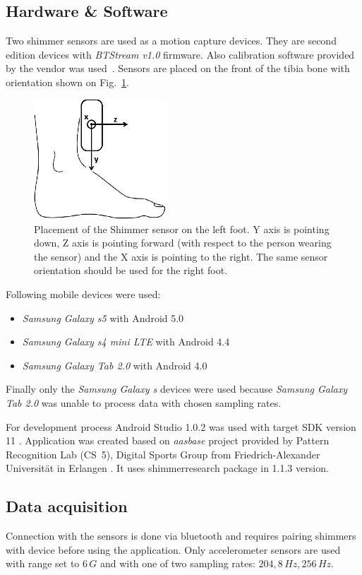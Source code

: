 \documentclass[conference]{IEEEtran}
\begin{document}
\subsection{Hardware \& Software}
Two shimmer sensors are used as a motion capture devices.
They are second edition devices with \emph{BTStream v1.0} firmware. Also calibration software provided by the vendor was used~\cite{ShimmerCalibration}.
Sensors are placed on the front of the tibia bone with orientation shown on Fig.~\ref{fig:ShimmerPlacement}.

\begin{figure}[!h]
    \centering
    \includegraphics[width=5cm]{Images/Foot.jpg}
    \caption{Placement of the Shimmer sensor on the left foot.
    Y axis is pointing down, Z axis is pointing forward (with respect to the person wearing the sensor) and the X axis is pointing to the right. The same sensor orientation should be used for the right foot.}
    \label{fig:ShimmerPlacement}
\end{figure}

Following mobile devices were used:
\begin{itemize}
    \item \emph{Samsung Galaxy s5} with Android 5.0
    \item \emph{Samsung Galaxy s4 mini LTE} with Android 4.4
    \item \emph{Samsung Galaxy Tab 2.0} with Android 4.0
\end{itemize}
Finally only the \emph{Samsung Galaxy s} devices were used because \emph{Samsung Galaxy Tab 2.0} was unable to process data with chosen sampling rates.

For development process Android Studio 1.0.2 was used with target SDK version 11 \cite{AndroidStudio}. 
Application was created based on \emph{aasbase} project provided by Pattern Recognition Lab (CS~5), Digital Sports Group from Friedrich-Alexander Universität in Erlangen \cite{CS5}.
It uses shimmerresearch package in 1.1.3 version.


\subsection{Data acquisition}
Connection with the sensors is done via bluetooth and requires pairing shimmers with device before using the application.
Only accelerometer sensors are used with range set to $6\,G$ and with one of two sampling rates: $204,8\,Hz, 256\,Hz$.
\end{document}
